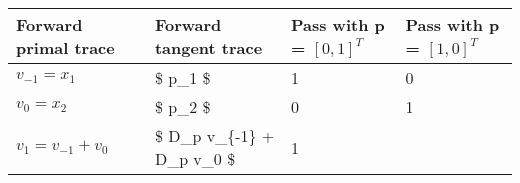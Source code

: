\documentclass[11pt]{article}
\begin{document}
\begin{longtable}[]{@{}llll@{}}
\toprule
\begin{minipage}[b]{0.22\columnwidth}\raggedright
Forward primal trace\strut
\end{minipage} & \begin{minipage}[b]{0.22\columnwidth}\raggedright
Forward tangent trace\strut
\end{minipage} & \begin{minipage}[b]{0.22\columnwidth}\raggedright
Pass with p = \([0, 1]^T\)\strut
\end{minipage} & \begin{minipage}[b]{0.22\columnwidth}\raggedright
Pass with p = \([1, 0]^T\)\strut
\end{minipage}\tabularnewline
\midrule
\endhead
\begin{minipage}[t]{0.22\columnwidth}\raggedright
\(v_{-1} = x_1\)\strut
\end{minipage} & \begin{minipage}[t]{0.22\columnwidth}\raggedright
\$ p\_1 \$\strut
\end{minipage} & \begin{minipage}[t]{0.22\columnwidth}\raggedright
1\strut
\end{minipage} & \begin{minipage}[t]{0.22\columnwidth}\raggedright
0\strut
\end{minipage}\tabularnewline
\begin{minipage}[t]{0.22\columnwidth}\raggedright
\(v_{0} = x_2\)\strut
\end{minipage} & \begin{minipage}[t]{0.22\columnwidth}\raggedright
\$ p\_2 \$\strut
\end{minipage} & \begin{minipage}[t]{0.22\columnwidth}\raggedright
0\strut
\end{minipage} & \begin{minipage}[t]{0.22\columnwidth}\raggedright
1\strut
\end{minipage}\tabularnewline
\begin{minipage}[t]{0.22\columnwidth}\raggedright
\(v_{1} = v_{-1} + v_0\)\strut
\end{minipage} & \begin{minipage}[t]{0.22\columnwidth}\raggedright
\$ D\_p v\_\{-1\} + D\_p v\_0 \$\strut
\end{minipage} & \begin{minipage}[t]{0.22\columnwidth}\raggedright
1\strut
\end{minipage} & \begin{minipage}[t]{0.22\columnwidth}\raggedright

\end{minipage}
\end{longtable}
\end{document}
